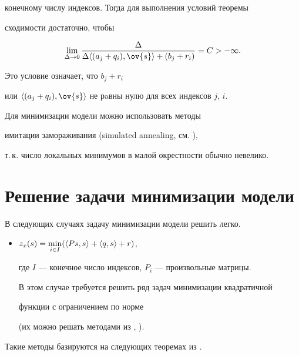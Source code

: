конечному числу индексов. Тогда для выполнения условий теоремы


сходимости достаточно, чтобы


$$


\lim_{\Delta \rar 0}


\frac{\Delta}{ \Delta \la (a_j+q_i) , \ov{s}\ra + (b_j+r_i)} = C >


-\infty.


$$


Это условие означает, что $b_j+r_i$


или $\la (a_j+q_i), \ov{s}\ra$ не рaвны нулю для всех индексов $j$, $i$. 





Для минимизации модели можно использовать методы


имитации замораживания (simulated annealing, см. \cite{handbook}), 


т.\,к. число локальных минимумов в малой окрестности обычно невелико.








\section{Решение задачи минимизации модели}





В следующих случаях задачу минимизации модели решить легко.


\begin{itemize}


\item[1)] $z_x (s) = \min\limits_{ i \in I} (\langle Ps,s\rangle+ \langle q,s\rangle + r)$,


где $I$ --- конечное число индексов, $P_i$ --- произвольные матрицы.


В этом случае требуется решить ряд задач минимизации квадратичной


функции с ограничением по норме


(их можно решать методами из \cite{more}, \cite{sore}).


\end{itemize}





Такие методы базируются на следующих теоремах из \cite{sore}.





